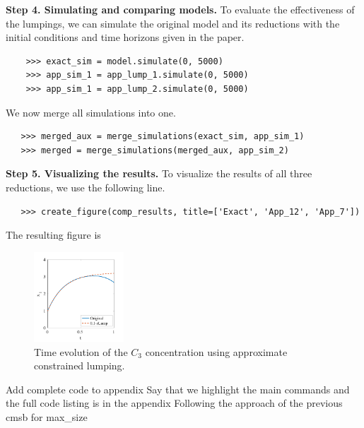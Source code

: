 \textbf{Step 4. Simulating and comparing models.}
To evaluate the effectiveness of the lumpings, we can simulate the original model and its reductions with the initial conditions and time horizons given in the paper. 
\begin{verbatim}
    >>> exact_sim = model.simulate(0, 5000)
    >>> app_sim_1 = app_lump_1.simulate(0, 5000)
    >>> app_sim_1 = app_lump_2.simulate(0, 5000)
\end{verbatim}
We now merge all simulations into one. 
\begin{verbatim}
   >>> merged_aux = merge_simulations(exact_sim, app_sim_1) 
   >>> merged = merge_simulations(merged_aux, app_sim_2) 
\end{verbatim}
\textbf{Step 5. Visualizing the results.}
To visualize the results of all three reductions, we use the following line.
\begin{verbatim}
   >>> create_figure(comp_results, title=['Exact', 'App_12', 'App_7']) 
\end{verbatim}
The resulting figure is 
\begin{figure}
    \centering
    \includegraphics[width=0.3\textwidth]{img/examplecalc.pdf}
    \caption{
        Time evolution of the $C_3$ concentration using approximate constrained lumping.}
\end{figure}

Add complete code to appendix
Say that we highlight the main commands and the full code listing is in the appendix
Following the approach of the previous cmsb for max\_size



